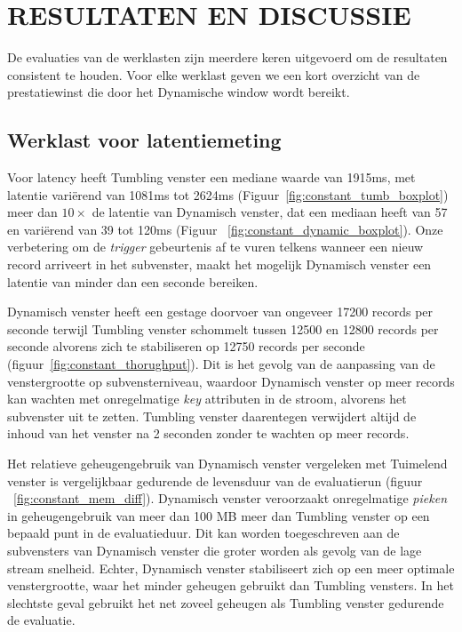 \section{RESULTATEN EN DISCUSSIE}%
\label{chap:Results and Discussion}

De evaluaties van de werklasten zijn meerdere keren uitgevoerd om de resultaten consistent te houden. 
Voor elke werklast geven we een kort overzicht van de prestatiewinst 
die door het Dynamische window wordt bereikt. 

\subsection{Werklast voor latentiemeting}%
\label{sec:Results Workload for latency measurement}
Voor latency heeft Tumbling venster een mediane waarde van 1915ms, 
met latentie vari\"erend van 1081ms tot 2624ms (Figuur~\ref{fig:constant_tumb_boxplot})
meer dan $10\times$ de latentie van Dynamisch venster, dat een mediaan heeft 
van 57 en vari\"erend van 39 tot 120ms (Figuur ~\ref{fig:constant_dynamic_boxplot}). 
Onze verbetering om de \emph{trigger} gebeurtenis af te vuren telkens wanneer een
nieuw record arriveert in het 
subvenster, maakt het mogelijk 
Dynamisch venster een latentie van minder dan een seconde bereiken. 

Dynamisch venster heeft een 
gestage doorvoer van ongeveer 17200 records per seconde terwijl Tumbling venster schommelt tussen 
12500 en 12800 records per seconde alvorens zich te stabiliseren op 12750 records per seconde (figuur~\ref{fig:constant_thorughput}). 
Dit is het gevolg van de aanpassing van de venstergrootte op subvensterniveau, waardoor Dynamisch venster op meer records kan wachten 
met onregelmatige \emph{key} attributen in de stroom, alvorens het subvenster uit te zetten. 
Tumbling venster daarentegen 
verwijdert altijd de inhoud van het venster na 2 seconden zonder te wachten op meer 
records.

Het relatieve geheugengebruik van Dynamisch venster vergeleken met Tuimelend venster 
is vergelijkbaar gedurende de levensduur van de 
evaluatierun (figuur ~\ref{fig:constant_mem_diff}). 
Dynamisch venster veroorzaakt onregelmatige \emph{pieken} in geheugengebruik van meer dan
100 MB meer dan Tumbling venster op een bepaald punt in de evaluatieduur. 
Dit kan worden toegeschreven 
aan de subvensters van Dynamisch venster die groter worden als gevolg van de lage stream 
snelheid. Echter,
Dynamisch venster stabiliseert zich op een meer optimale 
venstergrootte, waar het minder geheugen gebruikt dan Tumbling vensters. 
In het slechtste geval gebruikt het net zoveel geheugen als Tumbling venster gedurende de evaluatie. 

